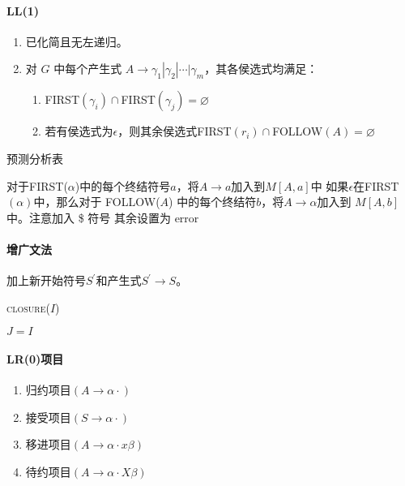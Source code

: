 \documentclass[10pt]{article}
\begin{document}
\begin{multicols}{3}
		\paragraph{LL(1)}
		\begin{enumerate}
			\item 已化简且无左递归。
			\item 对 $G$ 中每个产生式 $A\rightarrow \gamma_1|\gamma_2|\cdots|\gamma_m$，其各侯选式均满足：
			\begin{enumerate}
				\item FIRST$(\gamma_i)\cap$FIRST$(\gamma_j)=\varnothing$
				\item 若有侯选式为$\epsilon$，则其余侯选式FIRST$(r_i)\cap$FOLLOW$(A)=\varnothing$
			\end{enumerate}
		\end{enumerate}
		\begin{algorithm}[H]
			\caption{预测分析表}
			对于FIRST($\alpha$)中的每个终结符号$a$，将$A\rightarrow a$加入到$M[A,a]$中\;
			如果$\epsilon$在FIRST$(\alpha)$中，那么对于 FOLLOW($A$) 中的每个终结符$b$，将$A\rightarrow \alpha$加入到 $M[A,b]$ 中。注意加入 \$ 符号\;
			其余设置为 error\;
		\end{algorithm}
		\paragraph{增广文法}加上新开始符号$S^\prime$和产生式$S^\prime\rightarrow S$。
		
		\begin{algorithm}[H]
			\caption{\textsc{closure}($I$)}
				$J=I$\;
			\;
		\end{algorithm}
	
		\paragraph{LR(0)项目} \begin{enumerate}
			\item 归约项目$(A\rightarrow \alpha\cdot)$
			\item 接受项目$(S\rightarrow \alpha\cdot)$
			\item 移进项目$(A\rightarrow \alpha\cdot x \beta)$
			\item 待约项目$(A\rightarrow \alpha\cdot X \beta)$
		\end{enumerate}

\end{multicols}
\end{document}
